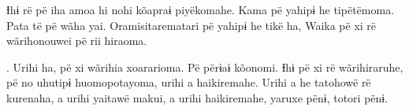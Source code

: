 Ɨhɨ rë pë iha amoa hi nohi kõapraɨ piyëkomahe. Kama pë yahipɨ he
tipëtëmoma. Pata të pë wãha yai. Oramisitarematari pë yahipɨ he tikë ha,
Waika pë xi rë wãrihonouwei pë rii hiraoma. 

. Urihi ha, pë xi wãrihia xoararioma. Pë përɨaɨ kõonomi. Ɨhɨ pë xi rë
wãrihiraruhe, pë no uhutipɨ huomopotayoma, urihi a haikiremahe. Urihi a
he tatohowë rë kurenaha, a urihi yaitawë makui, a urihi haikiremahe,
yaruxe pënɨ, totori pënɨ. 

 

 
